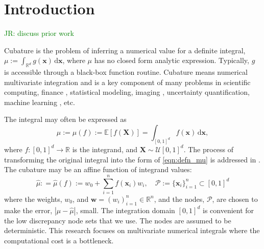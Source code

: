 \documentclass{svjour3}                     %
\newcommand{\bm}[1]{\boldsymbol{#1}}
\newcommand{\dif}[1]{\text{d}{#1}}
\newcommand{\reals}{\mathbb{R}}
\newcommand{\Ex}{\mathbb{E}}
\newcommand{\vw}{\bm{w}}
\newcommand{\vx}{\bm{x}}
\newcommand{\dvx}{\dif{\bm{x}}}
\newcommand{\hmu}{\widehat{\mu}}
\def\abs#1{\ensuremath{\left \lvert #1 \right \rvert}}
\newcommand{\JRNote}[1]{{\textcolor{green}{JR: #1}}}
\begin{document}
\section{Introduction}
\label{intro}


\JRNote{discuss prior work}


Cubature is the problem of inferring a numerical value for a definite integral, 
$ \mu := \int_{\reals^d} g(\vx) \, \dif \vx$, where $\mu$ has no closed form analytic expression. Typically, $g$ is accessible through a black-box function routine. 
Cubature means numerical multivariate integration and is a key component of many problems in scientific computing, finance \cite{Gla03}, statistical modeling, imaging \cite{Keller2013}, uncertainty quantification, machine learning \cite{Goodfellow-et-al-2016}, etc.

The integral may often be expressed as
\begin{equation}
\label{eqn:defn_mu}
\mu:= \mu(f) := \Ex[f(\boldsymbol{X})] = \int_{[0,1]^d} f(\vx)\, \dvx, 
\end{equation}
where $f:[0,1]^d \to \reals$ is the integrand, and $\boldsymbol{X} \sim \mathcal{U}[0,1]^d$.  The process of transforming the original integral into the form of \eqref{eqn:defn_mu} is addressed in \cite{BecHae92b, Sid08a, Sid93, Lau96a, CriEtal07}.  The cubature may be an affine function of integrand values:
\begin{equation}
\label{eqn:defn_hmu}  %
\hmu: = \hmu(f) := w_0 + \sum_{i=1}^{n} f(\vx_i) w_i, \quad \mathcal{P} :=\{\vx_i\}_{i=1}^n \subset [0,1]^d
\end{equation}
where the weights, $w_0$, and  $\vw = (w_i)_{i=1}^n \in \reals^n$, and the nodes, $\mathcal{P}$, are chosen to make the error, $\abs{\mu - \hmu}$, small. The integration domain $[0,1]^d$ is convenient for the low discrepancy node sets that we use.  The nodes are assumed to be deterministic.
This research focuses on multivariate numerical integrals where the computational cost is a bottleneck. %
\end{document}

